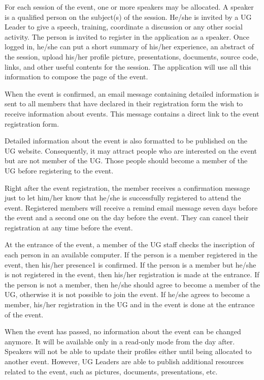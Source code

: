 \documentclass[envcountsame,envcountchap]{svmono}
\begin{document}
For each session of the event, one or more speakers may be allocated. A speaker is a qualified person on the subject(s) of the session. He/she is invited by a UG Leader to give a speech, training, coordinate a discussion or any other social activity. The person is invited to register in the application as a speaker.  Once logged in, he/she can put a short summary of his/her experience, an abstract of the session, upload his/her profile picture, presentations, documents, source code, links, and other useful contents for the session. The application will use all this information to compose the page of the event.

When the event is confirmed, an email message containing detailed information is sent to all members that have declared in their registration form the wish to receive information about events. This message contains a direct link to the event registration form.

Detailed information about the event is also formatted to be published on the UG website. Consequently, it may attract people who are interested on the event but are not member of the UG. Those people should become a member of the UG before registering to the event.

Right after the event registration, the member receives a confirmation message just to let him/her know that he/she is successfully registered to attend the event. Registered members will receive a remind email message seven days before the event and a second one on the day before the event. They can cancel their registration at any time before the event.

At the entrance of the event, a member of the UG staff checks the inscription of each person in an available computer. If the person is a member registered in the event, then his/her presence1 is confirmed. If the person is a member but he/she is not registered in the event, then his/her registration is made at the entrance. If the person is not a member, then he/she should agree to become a member of the UG, otherwise it is not possible to join the event. If he/she agrees to become a member, his/her registration in the UG and in the event is done at the entrance of the event.

When the event has passed, no information about the event can be changed anymore. It will be available only in a read-only mode from the day after. Speakers will not be able to update their profiles either until being allocated to another event. However, UG Leaders are able to publish additional resources related to the event, such as pictures, documents, presentations, etc.
\end{document}
